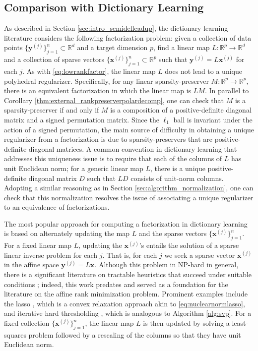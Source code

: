 \documentclass[11pt,letterpaper]{article}
\newcommand{\R}{\mathbb{R}}
\newcommand{\bx}{\mathbf{x}}
\newcommand{\by}{\mathbf{y}}
\begin{document}
\subsection{Comparison with Dictionary Learning} \label{sec:algorithm_cdl}
As described in Section \ref{sec:intro_semidefleadup}, the dictionary learning literature considers the following factorization problem: given a collection of data points $\{\by^{(j)}\}_{j=1}^n \subset \R^d$ and a target dimension $p$, find a linear map $L : \R^p \rightarrow \R^d$ and a collection of sparse vectors $\{\bx^{(j)}\}_{j=1}^n \subset \R^p$ such that $\by^{(j)} = L \bx^{(j)}$ for each $j$.  As with \eqref{eq:lowrankfactor}, the linear map $L$ does not lead to a unique polyhedral regularizer.  Specifically, for any linear sparsity-preserver $M : \R^p \rightarrow \R^p$, there is an equivalent factorization in which the linear map is $L M$.  In parallel to Corollary \ref{thm:external_rankpreserverpolardecomp}, one can check that $M$ is a sparsity-preserver if and only if $M$ is a composition of a positive-definite diagonal matrix and a signed permutation matrix.  Since the $\ell_1$ ball is invariant under the action of a signed permutation, the main source of difficulty in obtaining a unique regularizer from a factorization is due to sparsity-preservers that are positive-definite diagonal matrices.  A common convention in dictionary learning that addresses this uniqueness issue is to require that each of the columns of $L$ has unit Euclidean norm; for a generic linear map $L$, there is a unique positive-definite diagonal matrix $D$ such that $LD$ consists of unit-norm columns.  Adopting a similar reasoning as in Section \ref{sec:algorithm_normalization}, one can check that this normalization resolves the issue of associating a unique regularizer to an equivalence of factorizations.

The most popular approach for computing a factorization in dictionary learning is based on alternately updating the map $L$ and the sparse vectors $\{\bx^{(j)}\}_{j=1}^n$.  For a fixed linear map $L$, updating the $\bx^{(j)}$'s entails the solution of a sparse linear inverse problem for each $j$.  That is, for each $j$ we seek a sparse vector $\bx^{(j)}$ in the affine space $\by^{(j)} = L \bx$.  Although this problem in NP-hard in general, there is a significant literature on tractable heuristics that succeed under suitable conditions \cite{CRT:06,CT:06,CDS:98,Don:06,Don:06b,DonHuo:01}; indeed, this work predates and served as a foundation for the literature on the affine rank minimization problem.  Prominent examples include the lasso \cite{Tib:94}, which is a convex relaxation approach akin to \eqref{eq:nuclearnormlasso}, and iterative hard thresholding \cite{BD:09}, which is analogous to Algorithm \ref{alg:svp}.  For a fixed collection $\{\bx^{(j)}\}_{j=1}^n$, the linear map $L$ is then updated by solving a least-squares problem followed by a rescaling of the columns so that they have unit Euclidean norm.
\end{document}
